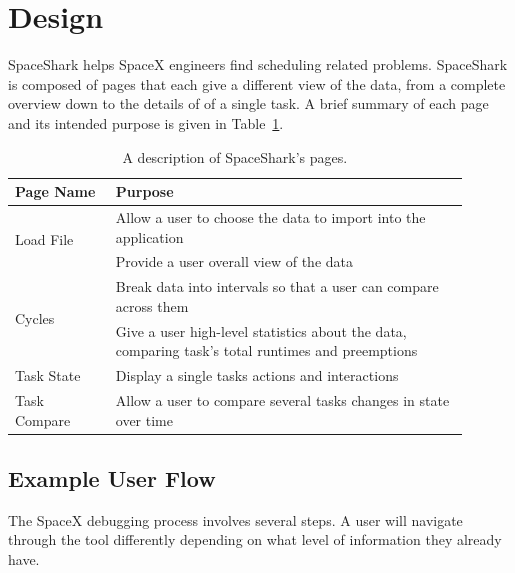 \documentclass{hmcclinic}
\begin{document}
\section{Design}

  SpaceShark helps SpaceX engineers find scheduling related problems.
  SpaceShark is composed of pages that each give a different view of the data,
  from a complete overview down to the details of of a single task. A brief
  summary of each page and its intended purpose is given in 
  Table~\ref{table:pages}.

\begin{table}[h]
\renewcommand{\arraystretch}{1.5}
  \begin{center}
    \begin{tabular}{p{0.2\linewidth}p{0.7\linewidth}}
     \toprule
      \textbf{Page Name}               & \textbf{Purpose}\\
      \midrule
      \multirow{2}{*}{Load File}       & Allow a user to choose the data to 
        import into the application\\
      Overview                         & Provide a user overall view of the 
        data\\
      \multirow{2}{*}{Cycles }         & Break data into intervals so that a 
        user can compare across them\\
      \multirow{2}{*}{Task Statistics} & Give a user high-level statistics 
        about the data, comparing task's total runtimes and preemptions\\
      Task State                       & Display a single tasks actions and 
        interactions\\
      \multirow{2}{*}{Task Compare}    & Allow a user to compare several tasks 
        changes in state over time\\
    \bottomrule
    \end{tabular}
  \end{center}
  \vspace{-1em}
  \caption{\label{table:pages} A description of SpaceShark's pages.}
\end{table}

\subsection{Example User Flow}
  The SpaceX debugging process involves several steps.  A user will navigate
  through the tool differently depending on what level of information they
  already have.
\end{document}
